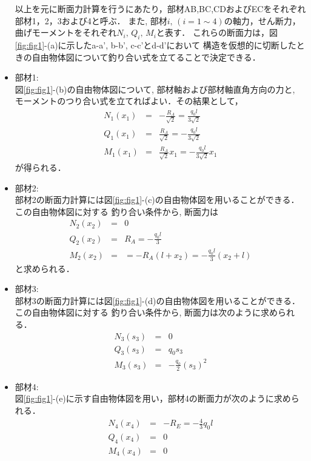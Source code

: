 \documentclass[10pt,a4j]{jarticle}
\begin{document}
\begin{itemize}
	以上を元に断面力計算を行うにあたり，部材AB,BC,CDおよびECをそれぞれ部材1，2，3および4と呼ぶ．
	また, 部材$i,\,(i=1\sim 4)$の軸力，せん断力，曲げモーメントをそれぞれ$N_i, \, Q_i,\, M_i$と表す．
	これらの断面力は，図\ref{fig:fig1}-(a)に示したa-a', b-b', c-c'とd-d'において
	構造を仮想的に切断したときの自由物体図について釣り合い式を立てることで決定できる．
\item
	{\rm 部材1:} \\
	図\ref{fig:fig1}-(b)の自由物体図について, 部材軸および部材軸直角方向の力と, 
	モーメントのつり合い式を立てればよい．その結果として，
	\begin{eqnarray}
		N_1(x_1) & =& -\frac{R_A}{\sqrt{2}}=\frac{q_0l}{3\sqrt{2}} \\
		Q_1(x_1) & =& \frac{R_A}{\sqrt{2}}=-\frac{q_0l}{3\sqrt{2}} \\
		M_1(x_1) & =& \frac{R_A}{\sqrt{2}}x_1 =-\frac{q_0l}{3\sqrt{2}}x_1
	\end{eqnarray}
	が得られる．
\item
	{\rm 部材2:} \\
	部材2の断面力計算には図\ref{fig:fig1}-(c)の自由物体図を用いることができる．この自由物体図に対する
	釣り合い条件から, 断面力は
	\begin{eqnarray}
		N_2(x_2) 
			&=& 0\\
		Q_2(x_2) 
			&=&
			R_A= -\frac{q_0l}{3} \\
		M_2(x_2) 
			&=&
			=-R_A(l+x_2)
			=-\frac{q_0l}{3}(x_2+l)
	\end{eqnarray}
	と求められる．
\item
	{\rm 部材3:} \\
	部材3の断面力計算には図\ref{fig:fig1}-(d)の自由物体図を用いることができる．この自由物体図に対する
	釣り合い条件から, 断面力は次のように求められる．
	\begin{eqnarray}
		N_3(s_3) 
			&=&  0 \\
		Q_3(s_3) 
			&=&
			q_0s_3 \\
		M_3(s_3) 
			&=&
			-\frac{q_0}{2}(s_3)^2
	\end{eqnarray}
\item
	{\rm 部材4:} \\
	図\ref{fig:fig1}-(e)に示す自由物体図を用い，部材4の断面力が次のように求められる．
	\begin{eqnarray}
		N_4(x_4) 
			&=&  -R_E=-\frac{4}{3}q_0l \\
		Q_4(x_4) 
			&=&  0 \\
		M_4(x_4) 
			&=&  0 
	\end{eqnarray}
\end{itemize}
\end{document}
